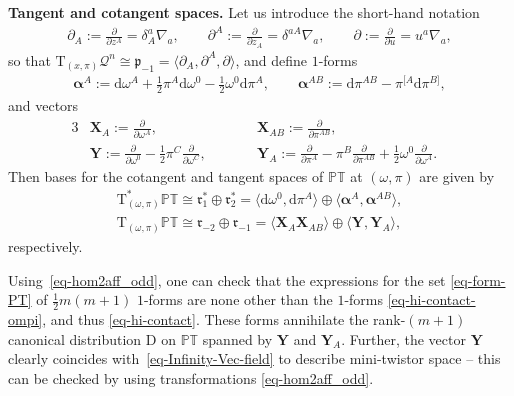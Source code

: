 \documentclass[pdftex]{sigma}
\numberwithin{equation}{section}
\newcommand{\parderv}[2] {\frac{\partial#1}{\partial#2}}
\newcommand{\mc} [1]{\mathcal{#1}}
\newcommand{\dd} {\mathrm{d}}
\newcommand{\Tgt} {\mathrm{T}}
\newcommand{\mfp} {\mathfrak{p}}
\newcommand{\mfr} {\mathfrak{r}}
\newcommand{\PT} {\mathbb{PT}}
\begin{document}
{\bf Tangent and cotangent spaces.} Let us introduce the short-hand notation
\begin{gather*}
\partial_{A} := \parderv{}{z^{A}} = \delta^a_A \nabla_a , \qquad \partial^{A} := \parderv{}{z_{A}} = \delta^{aA} \nabla_a , \qquad \partial := \parderv{}{u} = u^a \nabla_a ,
\end{gather*}
so that $\Tgt_{(x,\pi)} \mc{Q}^n \cong \mfp_{-1} = \langle \partial_{A} , \partial^{A} , \partial \rangle$, and def\/ine $1$-forms
\begin{gather}\label{eq-form-PT}
\bm{\alpha}^{A} := \dd \omega^{A} + \tfrac{1}{2} \pi^{A} \dd \omega^0 - \tfrac{1}{2} \omega^0 \dd \pi^{A} , \qquad \bm{\alpha}^{AB} := \dd \pi^{AB} - \pi^{[A} \dd \pi^{B]} ,
\end{gather}
and vectors
\begin{alignat}{3}
& \bm{X}_{A} := \parderv{}{\omega^{A}} , \qquad && \bm{X}_{AB} := \parderv{}{\pi^{AB}} ,& \nonumber\\
 & \bm{Y} := \parderv{}{\omega^0} - \frac{1}{2} \pi^{C} \parderv{}{\omega^C} , \qquad && \bm{Y}_{A} := \parderv{}{\pi^{A}} - \pi^{B} \parderv{}{\pi^{AB}} + \frac{1}{2} \omega^0 \parderv{}{\omega^A} .& \label{eq-vec-PT}
\end{alignat}
Then bases for the cotangent and tangent spaces of $\PT$ at $(\omega,\pi)$ are given by
\begin{gather*}
\Tgt^*_{(\omega,\pi)} \PT \cong \mfr^*_1 \oplus \mfr^*_2 = \big\langle \dd \omega^0, \dd \pi^A \big\rangle \oplus \big\langle \bm{\alpha}^{A} , \bm{\alpha}^{AB} \big\rangle , \\
 \Tgt_{(\omega,\pi)} \PT \cong \mfr_{-2} \oplus \mfr_{-1}
 = \big\langle \bm{X}_{A} \bm{X}_{AB} \big\rangle \oplus \big\langle \bm{Y} , \bm{Y}_{A} \big\rangle ,
\end{gather*}
respectively.

\begin{Remark}Using~\eqref{eq-hom2aff_odd}, one can check that the expressions for the set \eqref{eq-form-PT} of $\frac{1}{2}m(m+1)$ $1$-forms are none other than the $1$-forms \eqref{eq-hi-contact-ompi}, and thus \eqref{eq-hi-contact}. These forms annihilate the rank-$(m+1)$ canonical distribution $\mathrm{D}$ on $\PT$ spanned by $\bm{Y}$ and $\bm{Y}_{A}$. Further, the vector $\bm{Y}$ clearly coincides with~\eqref{eq-Infinity-Vec-field} to describe mini-twistor space -- this can be checked by using transformations \eqref{eq-hom2aff_odd}.
\end{Remark}
\end{document}
